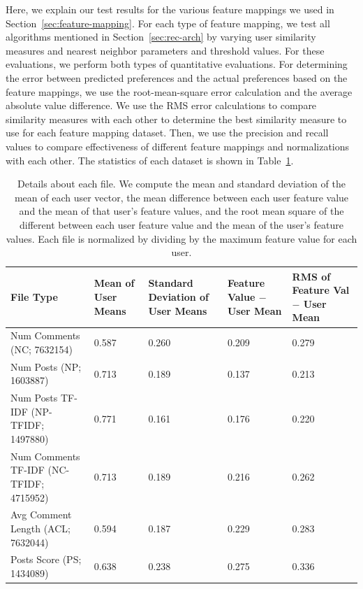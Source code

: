 \documentclass{article}
\begin{document}
Here, we explain our test results for the various feature mappings we used in Section~\ref{sec:feature-mapping}. 
For each type of feature mapping, we test all algorithms mentioned in Section~\ref{sec:rec-arch} by varying user
similarity measures and nearest neighbor parameters and threshold values. For these evaluations, 
we perform both types of quantitative evaluations. For determining the error between predicted preferences and 
the actual preferences based on the feature mappings, we use the root-mean-square error calculation and the average
absolute value difference. We use the RMS error calculations to compare similarity measures with each
other to determine the best similarity measure to use for each feature mapping dataset. Then, we use the 
precision and recall values to compare effectiveness of different feature mappings and normalizations
with each other.
The statistics of each dataset is shown in Table~\ref{dataset-chars}.

\begin{table}
    \begin{tabular}{ |p{2.5cm}|p{2cm}|p{3cm}|p{3cm}|p{2.5cm}|}
    \hline
    File Type& Mean of User Means & Standard Deviation of User Means & Feature Value $-$ User Mean & RMS of Feature Val $-$ User Mean\\ \hline\hline
    Num Comments (NC; 7632154)& 0.587 & 0.260 & 0.209 & 0.279 \\ \hline
    Num Posts (NP; 1603887)& 0.713 & 0.189 & 0.137 & 0.213 \\ \hline
    Num Posts TF-IDF (NP-TFIDF; 1497880) & 0.771 & 0.161 &  0.176 & 0.220 \\ \hline
    Num Comments TF-IDF (NC-TFIDF; 4715952) & 0.713 & 0.189 & 0.216 & 0.262 \\ \hline
    Avg Comment Length (ACL; 7632044) & 0.594 & 0.187 & 0.229 & 0.283 \\ \hline
    Posts Score (PS; 1434089) & 0.638 & 0.238 & 0.275 & 0.336 \\
    \hline
    \end{tabular}
    \caption{Details about each file. We compute the mean and standard deviation of the mean of each user vector,
     the mean difference between each user feature value and the mean of that user's feature values, and the root mean
     square of the different between each user feature value and the mean of the user's feature values. 
     Each file is normalized by dividing by the maximum feature value for each user.}\label{dataset-chars}
\end{table}
\end{document}
